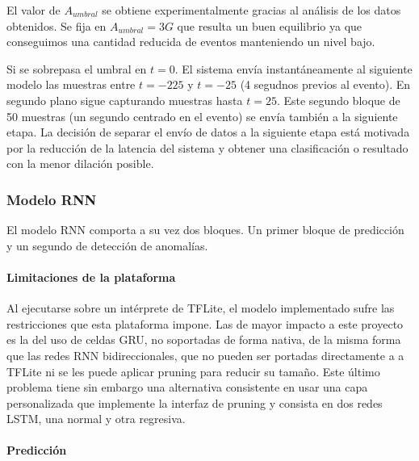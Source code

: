 El valor de $A_{umbral}$ se obtiene experimentalmente gracias al análisis de los datos obtenidos. Se fija en $A_{umbral} = 3G$ que resulta un buen equilibrio ya que conseguimos una cantidad reducida de eventos manteniendo un nivel bajo. 

Si se sobrepasa el umbral en $t=0$. El sistema envía instantáneamente al siguiente modelo las muestras entre $t=-225$ y $t=-25$ (4 segudnos previos al evento). En segundo plano sigue capturando muestras hasta $t=25$. Este segundo bloque de 50 muestras (un segundo centrado en el evento) se envía también a la siguiente etapa. La decisión de separar el envío de datos a la siguiente etapa está motivada por la reducción de la latencia del sistema y obtener una clasificación o resultado con la menor dilación posible.


\subsubsection{Modelo RNN}

El modelo RNN comporta a su vez dos bloques. Un primer bloque de predicción y un segundo de detección de anomalías. 

\paragraph{Limitaciones de la plataforma}
Al ejecutarse sobre un intérprete de TFLite, el modelo implementado sufre las restricciones que esta plataforma impone. Las de mayor impacto a este proyecto es la del uso de celdas GRU, no soportadas de forma nativa\cite{tfliteGru}, de la misma forma que las redes RNN bidireccionales, que no pueden ser portadas directamente a a TFLite\cite{tfliteBidir} ni se les puede aplicar pruning para reducir su tamaño\cite{tfPruneBidir}. Este último problema tiene sin embargo una alternativa consistente en usar una capa personalizada que implemente la interfaz de pruning y consista en dos redes LSTM, una normal y otra regresiva.


\paragraph*{Predicción}

